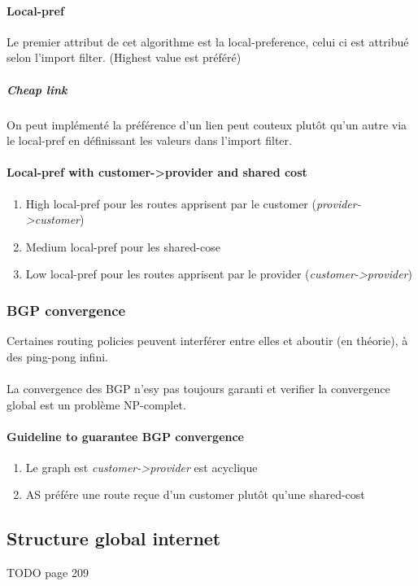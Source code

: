 \documentclass{report}
\begin{document}
\paragraph{Local-pref} 
Le premier attribut de cet algorithme est la local-preference, celui ci est attribué
selon l'import filter. (Highest value est préféré)

\subparagraph{Cheap link} On peut implémenté la préférence d'un lien peut couteux
plutôt qu'un autre via le local-pref en définissant les valeurs dans l'import filter.


\paragraph{Local-pref with customer->provider and shared cost}
\begin{enumerate}
    \item High local-pref pour les routes apprisent par le customer (\textit{provider->customer})
    \item Medium local-pref pour les shared-cose
    \item Low local-pref pour les routes apprisent par le provider (\textit{customer->provider})
\end{enumerate}


\subsubsection{BGP convergence}
Certaines routing policies peuvent interférer entre elles et aboutir (en théorie), 
à des ping-pong infini.

\paragraph{ } La convergence des BGP n'esy pas toujours garanti et verifier la 
convergence global est un problème NP-complet.

\paragraph{Guideline to guarantee BGP convergence}
\begin{enumerate}
    \item Le graph est \textit{customer->provider} est acyclique
    \item AS préfére une route reçue d'un customer plutôt qu'une shared-cost
\end{enumerate}

\subsection{Structure global internet}
TODO page 209
\end{document}
